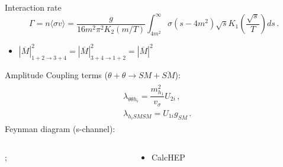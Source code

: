 \begin{frame}
    \pause
\begin{block}{Interaction rate \cite{kolb}}
    \begin{equation}
	\Gamma=n\langle \sigma v \rangle =\frac{g}{16m^2\pi^2K_2(m/T)}\int_{4m^2}^\infty\sigma(s-4m^2)\sqrt{s}K_1\left(\frac{\sqrt{s}}{T}\right)ds\,.
    \end{equation}
\end{block}
\bigskip
\begin{itemize}
 \pause
 \item $|\overline{M}|^2_{1 + 2 \rightarrow 3 + 4}=|\overline{M}|^2_{3 + 4 \rightarrow 1 + 2}=|\overline{M}|^2$ \cite{kolb}
 \end{itemize}
\end{frame}
\begin{frame}{Amplitude}
Coupling terms ($\theta+\theta\rightarrow SM+\overline{SM}$): 
    \begin{align}
	\label{couplingterms}
	\begin{array}{ll}
	&\lambda_{\theta\theta h_i}=\dfrac{m_{h_1}^2}{v_\sigma}U_{2i}\,,\\	[8pt]
	&\lambda_{h_i SM SM}=U_{1i}g_{SM}\,.
	\end{array}
    \end{align}
    \pause
    Feynman diagram (s-channel):
    \begin{columns}
    \begin{column}{0.5\textwidth}
    \begin{center}
    ;
    \end{center}
    \end{column}
    \begin{column}{0.5\textwidth}
    \pause
    \begin{center}
    \begin{itemize}
        \item CalcHEP
    \end{itemize}
    \end{center}
    \end{column}
    \end{columns}
\end{frame}
